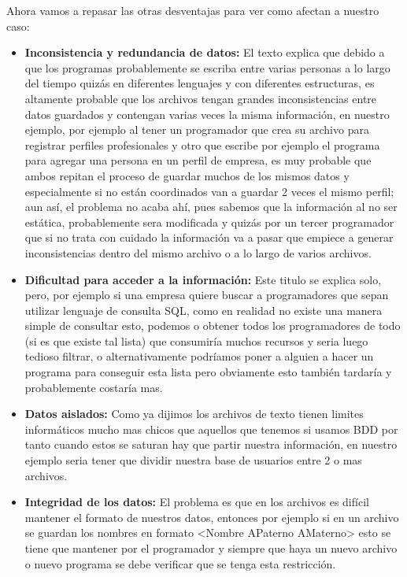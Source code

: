 Ahora vamos a repasar las otras desventajas para ver como afectan a nuestro caso:
\begin{itemize}
    \item \textbf{Inconsistencia y redundancia de datos:} El texto explica que debido a que los programas probablemente se escriba entre varias personas a lo largo del tiempo quizás en diferentes lenguajes y con diferentes estructuras, es altamente probable que los archivos tengan grandes inconsistencias entre datos guardados y contengan varias veces la misma información, en nuestro ejemplo, por ejemplo al tener un programador que crea su archivo para registrar perfiles profesionales y otro que escribe por ejemplo el programa para agregar una persona en un perfil de empresa, es muy probable que ambos repitan el proceso de guardar muchos de los mismos datos y especialmente si no están coordinados van a guardar 2 veces el mismo perfil; aun así, el problema no acaba ahí, pues sabemos que la información al no ser estática, probablemente sera modificada y quizás por un tercer programador que si no trata con cuidado la información va a pasar que empiece a generar inconsistencias dentro del mismo archivo o a lo largo de varios archivos.\\
    \item \textbf{Dificultad para acceder a la información:} Este titulo se explica solo, pero, por ejemplo si una empresa quiere buscar a programadores que sepan utilizar lenguaje de consulta SQL, como en realidad no existe una manera simple de consultar esto, podemos o obtener todos los programadores de todo (si es que existe tal lista) que consumiría muchos recursos y seria luego tedioso filtrar, o alternativamente podríamos poner a alguien a hacer un programa para conseguir esta lista pero obviamente esto también tardaría y probablemente costaría mas.\\
    \item \textbf{Datos aislados:} Como ya dijimos los archivos de texto tienen limites informáticos mucho mas chicos que aquellos que tenemos si usamos BDD por tanto cuando estos se saturan hay que partir nuestra información, en nuestro ejemplo seria tener que dividir nuestra base de usuarios entre 2 o mas archivos.\\
    \item \textbf{Integridad de los datos:} El problema es que en los archivos es difícil mantener el formato de nuestros datos, entonces por ejemplo si en un archivo se guardan los nombres en formato <Nombre APaterno AMaterno> esto se tiene que mantener por el programador y siempre que haya un nuevo archivo o nuevo programa se debe verificar que se tenga esta restricción.\\

\end{itemize}
